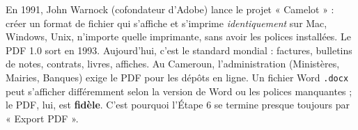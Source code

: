 \documentclass[11pt]{article}
\begin{document}
\begin{savaistu}
En 1991, John Warnock (cofondateur d'Adobe) lance le projet « Camelot » : créer un format de fichier qui s'affiche et s'imprime \emph{identiquement} sur Mac, Windows, Unix, n'importe quelle imprimante, sans avoir les polices installées. Le PDF 1.0 sort en 1993. Aujourd'hui, c'est le standard mondial : factures, bulletins de notes, contrats, livres, affiches. Au Cameroun, l'administration (Ministères, Mairies, Banques) exige le PDF pour les dépôts en ligne. Un fichier Word \texttt{.docx} peut s'afficher différemment selon la version de Word ou les polices manquantes ; le PDF, lui, est \textbf{fidèle}. C'est pourquoi l'Étape 6 se termine presque toujours par « Export PDF ».
\end{savaistu}
\end{document}
